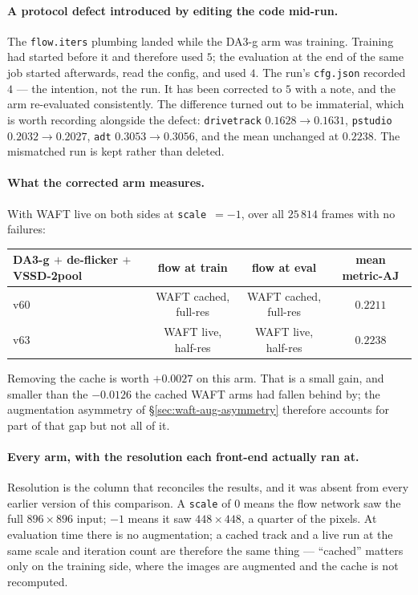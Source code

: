 \documentclass[11pt,a4paper]{article}
\begin{document}
\paragraph{A protocol defect introduced by editing the code mid-run.} The \texttt{flow.iters}
plumbing landed while the DA3-g arm was training. Training had started before it and therefore used $5$;
the evaluation at the end of the same job started afterwards, read the config, and used $4$. The
run's \texttt{cfg.json} recorded $4$ --- the intention, not the run. It has been corrected to $5$
with a note, and the arm re-evaluated consistently. The difference turned out to be immaterial,
which is worth recording alongside the defect: \texttt{drivetrack} $0.1628 \to 0.1631$,
\texttt{pstudio} $0.2032 \to 0.2027$, \texttt{adt} $0.3053 \to 0.3056$, and the mean unchanged at
$0.2238$. The mismatched run is kept rather than deleted.

\paragraph{What the corrected arm measures.} With WAFT live on both sides at
\texttt{scale}~$=-1$, over all $25\,814$ frames with no failures:

\begin{center}\small
\begin{tabular}{lccc}
\toprule
DA3-g $+$ de-flicker $+$ VSSD-2pool & flow at train & flow at eval & mean metric-AJ \\
\midrule
v60 & WAFT cached, full-res & WAFT cached, full-res & $0.2211$ \\
v63 & WAFT live, half-res   & WAFT live, half-res   & $\mathbf{0.2238}$ \\
\bottomrule
\end{tabular}
\end{center}

Removing the cache is worth $+0.0027$ on this arm. That is a small gain, and smaller than the
$-0.0126$ the cached WAFT arms had fallen behind by; the augmentation asymmetry of
\S\ref{sec:waft-aug-asymmetry} therefore accounts for part of that gap but not all of it.

\paragraph{Every arm, with the resolution each front-end actually ran at.} Resolution is the column
that reconciles the results, and it was absent from every earlier version of this comparison. A
\texttt{scale} of $0$ means the flow network saw the full $896 \times 896$ input; $-1$ means it saw
$448 \times 448$, a quarter of the pixels. At evaluation time there is no augmentation; a cached
track and a live run at the same scale and iteration count are therefore the same thing --- ``cached'' matters
only on the training side, where the images are augmented and the cache is not recomputed.
\end{document}
